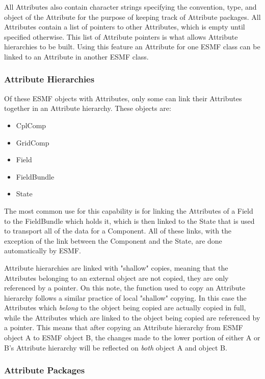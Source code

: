 All Attributes also contain character strings specifying the convention, type, and object of the Attribute for the purpose of keeping track of Attribute packages.  All Attributes contain a list of pointers to other Attributes, which is empty until specified otherwise.  This list of Attribute pointers is what allows Attribute hierarchies to be built.  Using this feature an Attribute for one ESMF class can be linked to an Attribute in another ESMF class.

\subsubsection{Attribute Hierarchies}

Of these ESMF objects with Attributes, only some can link their Attributes together in an Attribute hierarchy.  These objects are:

\begin{itemize}
\item CplComp
\item GridComp
\item Field
\item FieldBundle
\item State
\end{itemize}

The most common use for this capability is for linking the Attributes of a Field to the FieldBundle which holds it, which is then linked to the State that is used to transport all of the data for a Component.  All of these links, with the exception of the link between the Component and the State, are done automatically by ESMF.  

Attribute hierarchies are linked with "shallow" copies, meaning that the Attributes belonging to an external object are not copied, they are only referenced by a pointer.  On this note, the function used to copy an Attribute hierarchy follows a similar practice of local "shallow" copying.  In this case the Attributes which {\it belong} to the object being copied are actually copied in full, while the Attributes which are linked to the object being copied are referenced by a pointer.  This means that after copying an Attribute hierarchy from ESMF object A to ESMF object B, the changes made to the lower portion of either A or B's Attribute hierarchy will be reflected on {\it both} object A and object B.

\subsubsection{Attribute Packages}

